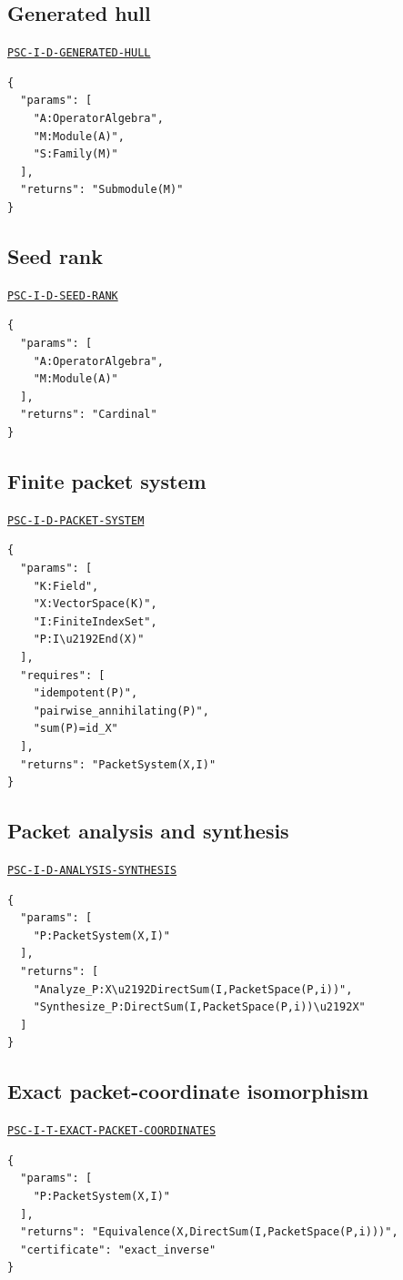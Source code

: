 \documentclass[a4paper,11pt]{article}
\begin{document}
\subsection*{Generated hull}
\hyperref[rec:PSC-I-D-GENERATED-HULL]{\nolinkurl{PSC-I-D-GENERATED-HULL}}
\begin{lstlisting}
{
  "params": [
    "A:OperatorAlgebra",
    "M:Module(A)",
    "S:Family(M)"
  ],
  "returns": "Submodule(M)"
}
\end{lstlisting}
\subsection*{Seed rank}
\hyperref[rec:PSC-I-D-SEED-RANK]{\nolinkurl{PSC-I-D-SEED-RANK}}
\begin{lstlisting}
{
  "params": [
    "A:OperatorAlgebra",
    "M:Module(A)"
  ],
  "returns": "Cardinal"
}
\end{lstlisting}
\subsection*{Finite packet system}
\hyperref[rec:PSC-I-D-PACKET-SYSTEM]{\nolinkurl{PSC-I-D-PACKET-SYSTEM}}
\begin{lstlisting}
{
  "params": [
    "K:Field",
    "X:VectorSpace(K)",
    "I:FiniteIndexSet",
    "P:I\u2192End(X)"
  ],
  "requires": [
    "idempotent(P)",
    "pairwise_annihilating(P)",
    "sum(P)=id_X"
  ],
  "returns": "PacketSystem(X,I)"
}
\end{lstlisting}
\subsection*{Packet analysis and synthesis}
\hyperref[rec:PSC-I-D-ANALYSIS-SYNTHESIS]{\nolinkurl{PSC-I-D-ANALYSIS-SYNTHESIS}}
\begin{lstlisting}
{
  "params": [
    "P:PacketSystem(X,I)"
  ],
  "returns": [
    "Analyze_P:X\u2192DirectSum(I,PacketSpace(P,i))",
    "Synthesize_P:DirectSum(I,PacketSpace(P,i))\u2192X"
  ]
}
\end{lstlisting}
\subsection*{Exact packet-coordinate isomorphism}
\hyperref[rec:PSC-I-T-EXACT-PACKET-COORDINATES]{\nolinkurl{PSC-I-T-EXACT-PACKET-COORDINATES}}
\begin{lstlisting}
{
  "params": [
    "P:PacketSystem(X,I)"
  ],
  "returns": "Equivalence(X,DirectSum(I,PacketSpace(P,i)))",
  "certificate": "exact_inverse"
}
\end{lstlisting}
\end{document}
